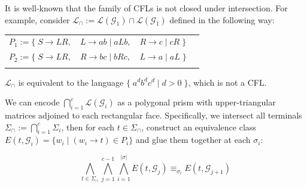 \documentclass[portrait,a0b,final,a4resizeable]{a0poster}
\begin{document}
\begin{poster}
\begin{multicols}{2}

      {\huge
      \hspace*{2.5cm}\begin{minipage}[c]{0.90\columnwidth}
       \vspace{1cm}It is well-known that the family of CFLs is not closed under intersection. For example, consider $\mathcal{L}_\cap := \mathcal{L}(\mathcal{G}_1) \cap \mathcal{L}(\mathcal{G}_1)$ defined in the following way:\\

       \begin{center}
        \begin{tabular}{llll}
          $P_1 := \big\{\;S \rightarrow L R,$ & $L \rightarrow a b \mid a L b,$ & $R \rightarrow c \mid c R\;\big\}$\vspace{5pt}\\
          $P_2 := \big\{\;S \rightarrow L R,$ & $R \rightarrow b c \mid b R c,$ & $L \rightarrow a \mid a L\;\big\}$\\\\
        \end{tabular}
        \end{center}

         $\mathcal{L}_\cap$ is equivalent to the language $\big\{\;a^d b^d c^d \mid d > 0\;\big\}$, which is not a CFL.

       We can encode $\bigcap_{i=1}^c \mathcal{L}(\mathcal{G}_i)$ as a polygonal prism with upper-triangular matrices adjoined to each rectangular face. Specifically, we intersect all terminals $\Sigma_\cap := \bigcap_{i=1}^c \Sigma_i$, then for each $t \in \Sigma_\cap$, construct an equivalence class $E(t, \mathcal{G}_i) = \{ w_i \mid (w_i \rightarrow t) \in P_i\}$ and glue them together at each $\sigma_i$:

       \[
         \bigwedge_{t\in\Sigma_\cap}\bigwedge_{j = 1}^{c-1}\bigwedge_{i=1}^{|\sigma|} E(t, \mathcal{G}_j) \equiv_{\sigma_i} E(t, \mathcal{G}_{j+1})
         \]


\end{minipage}}
\end{multicols}
\end{poster}
\end{document}
